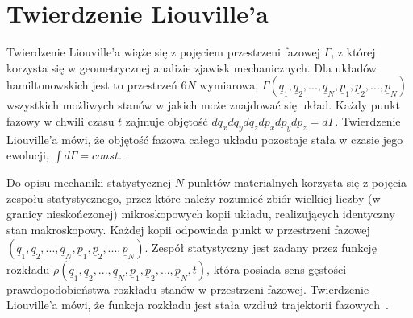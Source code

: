 \documentclass[12pt,a4paper,openright]{report} %
\begin{document}
\section{Twierdzenie Liouville'a}
Twierdzenie Liouville'a wiąże się z pojęciem przestrzeni fazowej $\Gamma$, z której korzysta się w geometrycznej analizie zjawisk mechanicznych. Dla układów hamiltonowskich jest to przestrzeń $6N$ wymiarowa, $\Gamma(\underline{q}_1, \underline{q}_2,...,\underline{q}_N, \underline{p}_1, \underline{p}_2,...,\underline{p}_N)$ wszystkich możliwych stanów w jakich może znajdować się układ. Każdy punkt fazowy w chwili czasu $t$ zajmuje objętość $dq_x dq_y dq_z dp_x dp_y dp_z= d\Gamma$. Twierdzenie Liouville'a mówi, że objętość fazowa całego układu pozostaje stała w czasie jego ewolucji, $ \int d \Gamma = const.$ \cite{Landau}.

Do opisu mechaniki statystycznej $N$ punktów materialnych korzysta się z pojęcia zespołu statystycznego, przez które należy rozumieć zbiór wielkiej liczby (w granicy nieskończonej) mikroskopowych kopii układu, realizujących identyczny stan makroskopowy. Każdej kopii odpowiada punkt w przestrzeni fazowej $(\underline{q}_1, \underline{q}_2,...,\underline{q}_N, \underline{p}_1, \underline{p}_2,...,\underline{p}_N)$. Zespół statystyczny jest zadany przez funkcję rozkładu $\rho(\underline{q}_1, \underline{q}_2,...,\underline{q}_N, \underline{p}_1, \underline{p}_2,...,\underline{p}_N, t)$, która posiada sens gęstości prawdopodobieństwa rozkładu stanów w przestrzeni fazowej. Twierdzenie Liouville'a mówi, że funkcja rozkładu jest stała wzdłuż trajektorii fazowych~\cite{Zubariew}.

%
\end{document}
